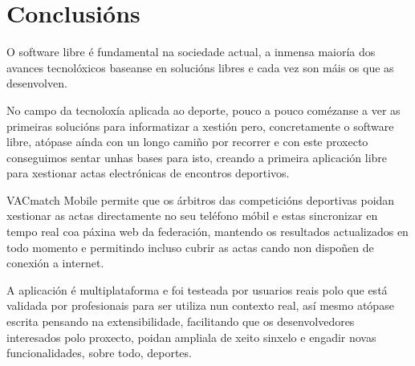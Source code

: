 \section{Conclusións}
O software libre é fundamental na sociedade actual, a inmensa maioría dos 
avances tecnolóxicos baseanse en solucións libres e cada vez son máis os que  
as desenvolven.

  No campo da tecnoloxía aplicada ao deporte, pouco a pouco comézanse a ver as 
primeiras solucións para informatizar a xestión pero, concretamente o 
software libre, atópase aínda con un longo camiño por recorrer e con este 
proxecto conseguimos sentar unhas bases para isto, creando a primeira 
aplicación libre para xestionar actas electrónicas de encontros deportivos.

  VACmatch Mobile permite que os árbitros das competicións deportivas poidan 
xestionar as actas directamente no seu teléfono móbil e estas 
sincronizar en tempo real coa páxina web da federación, mantendo os 
resultados actualizados en todo momento e permitindo incluso cubrir as 
actas cando non dispoñen de conexión a internet.

  A aplicación é multiplataforma e foi testeada por usuarios reais polo que 
está validada por profesionais para ser utiliza nun contexto real, así mesmo 
atópase escrita pensando na extensibilidade, facilitando que os desenvolvedores 
interesados polo proxecto, poidan ampliala de xeito sinxelo e engadir novas 
funcionalidades, sobre todo, deportes.
